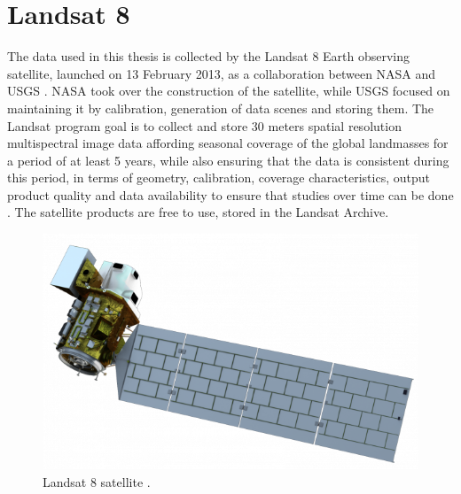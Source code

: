 \documentclass[12pt, a4paper]{report}
\begin{document}
	\section{Landsat 8}
	The data used in this thesis is collected by the Landsat 8 Earth observing satellite, launched on 13 February 2013, as a collaboration between NASA and USGS \cite{temporal}. NASA took over the construction of the satellite, while USGS focused on maintaining it by calibration, generation of data scenes and storing them. The Landsat program goal is to collect and store 30 meters spatial resolution multispectral image data affording seasonal coverage of the global landmasses for a period of at least 5 years, while also ensuring that the data is consistent during this period, in terms of geometry, calibration, coverage characteristics, output product quality and data availability to ensure that studies over time can be done \cite{landsat_wiki}\cite{temporal}. The satellite products are free to use, stored in the Landsat Archive.
	\begin{figure}[h]
		\centering
		\includegraphics[scale=0.4]{landsat_8.png}
		\caption{Landsat 8 satellite \cite{landsat_8_image}.}
		\label{fig:Landsat8_satellite}
	\end{figure}
	
\end{document}
